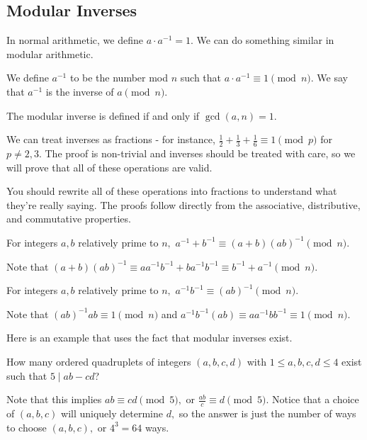 \documentclass{article}
\begin{document}
\subsection{Modular Inverses}
In normal arithmetic, we define $a\cdot a^{-1}=1.$ We can do something similar in modular arithmetic.

\begin{defi}We define $a^{-1}$ to be the number mod $n$ such that $a\cdot a^{-1}\equiv 1 \pmod{n}.$ We say that $a^{-1}$ is the inverse of $a \pmod{n}.$\end{defi}

The modular inverse is defined if and only if $\gcd(a,n)=1.$

We can treat inverses as fractions - for instance, $\frac{1}{2}+\frac{1}{3}+\frac{1}{6}\equiv 1\pmod{p}$ for $p\neq 2,3.$ The proof is non-trivial and inverses should be treated with care, so we will prove that all of these operations are valid.

You should rewrite all of these operations into fractions to understand what they're really saying. The proofs follow directly from the associative, distributive, and commutative properties.

\begin{fact}
For integers $a,b$ relatively prime to $n,$ $a^{-1}+b^{-1}\equiv (a+b)(ab)^{-1}\pmod{n}.$
\end{fact}

\begin{pro}
Note that $(a+b)(ab)^{-1}\equiv aa^{-1}b^{-1}+ba^{-1}b^{-1}\equiv b^{-1}+a^{-1}\pmod{n}.$
\end{pro}

\begin{fact}
For integers $a,b$ relatively prime to $n,$ $a^{-1}b^{-1}\equiv(ab)^{-1}\pmod{n}.$
\end{fact}

\begin{pro}
Note that $(ab)^{-1}ab\equiv 1\pmod{n}$ and $a^{-1}b^{-1}(ab)\equiv aa^{-1}bb^{-1}\equiv 1\pmod{n}.$
\end{pro}

Here is an example that uses the fact that modular inverses exist.

\begin{exam}
How many ordered quadruplets of integers $(a,b,c,d)$ with $1\leq a,b,c,d\leq 4$ exist such that $5\mid ab-cd$?
\end{exam}

\begin{sol}
Note that this implies $ab\equiv cd\pmod{5},$ or $\frac{ab}{c}\equiv d\pmod{5}.$ Notice that a choice of $(a,b,c)$ will uniquely determine $d,$ so the answer is just the number of ways to choose $(a,b,c),$ or $4^3=64$ ways.
\end{sol}
\end{document}
